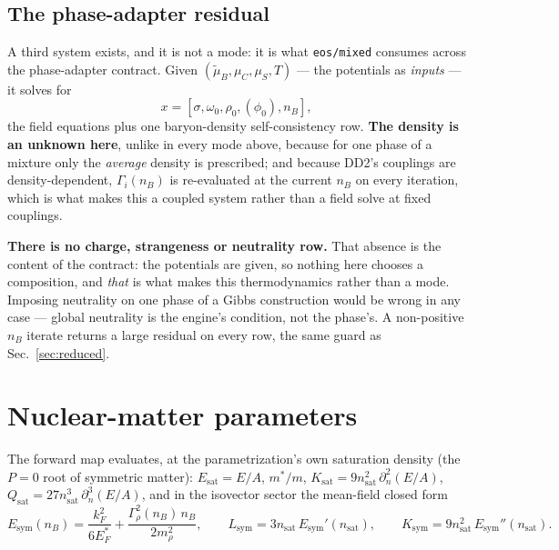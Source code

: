 \documentclass[aps,prc,onecolumn,superscriptaddress,nofootinbib,10pt]{revtex4-2}
\newcommand{\nB}{n_B}
\newcommand{\nsat}{n_{\mathrm{sat}}}
\newcommand{\muC}{\mu_C}
\newcommand{\muS}{\mu_S}
\begin{document}
\subsection{The phase-adapter residual}
\label{sec:adapter}

A third system exists, and it is not a mode: it is what \texttt{eos/mixed}
consumes across the phase-adapter contract. Given
$(\tilde\mu_B, \muC, \muS, T)$ --- the potentials as \emph{inputs} --- it
solves for
%
\begin{equation}
x = [\sigma, \omega_0, \rho_0, (\phi_0), \nB] ,
\end{equation}
%
the field equations plus one baryon-density self-consistency row. \textbf{The
density is an unknown here}, unlike in every mode above, because for one phase
of a mixture only the \emph{average} density is prescribed; and because DD2's
couplings are density-dependent, $\Gamma_i(\nB)$ is re-evaluated at the
current $\nB$ on every iteration, which is what makes this a coupled system
rather than a field solve at fixed couplings.

\textbf{There is no charge, strangeness or neutrality row.} That absence is the
content of the contract: the potentials are given, so nothing here chooses a
composition, and \emph{that} is what makes this thermodynamics rather than a
mode. Imposing neutrality on one phase of a Gibbs construction would be wrong
in any case --- global neutrality is the engine's condition, not the phase's.
A non-positive $\nB$ iterate returns a large residual on every row, the same
guard as Sec.~\ref{sec:reduced}.

\section{Nuclear-matter parameters}

The forward map evaluates, at the parametrization's own saturation density
(the $P=0$ root of symmetric matter): $E_{\mathrm{sat}} = E/A$,
$m^*/m$, $K_{\mathrm{sat}} = 9 \nsat^2\, \partial^2_n (E/A)$,
$Q_{\mathrm{sat}} = 27 \nsat^3\, \partial^3_n (E/A)$, and in the isovector
sector the mean-field closed form
%
\begin{equation}
E_{\mathrm{sym}}(\nB) = \frac{k_F^2}{6 E^*_F}
  + \frac{\Gamma_\rho^2(\nB)\, \nB}{2 m_\rho^2},
\qquad L_{\mathrm{sym}} = 3 \nsat\, E_{\mathrm{sym}}'(\nsat),
\qquad K_{\mathrm{sym}} = 9 \nsat^2\, E_{\mathrm{sym}}''(\nsat).
\label{eq:esym}
\end{equation}
\end{document}
